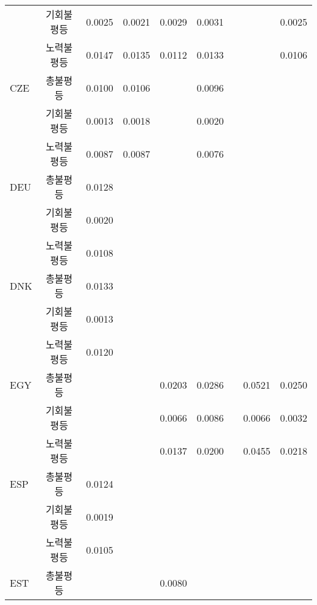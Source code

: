 \begin{longtable}{cc|rrrrrrr}
          & 기회불평등 & 0.0025 & 0.0021 & 0.0029 & 0.0031 &       &       & 0.0025 \\
          & 노력불평등 & 0.0147 & 0.0135 & 0.0112 & 0.0133 &       &       & 0.0106 \\
    \multicolumn{1}{l}{CZE} & 총불평등  & 0.0100 & 0.0106 &       & 0.0096 &       &       & \multicolumn{1}{l}{         } \\
          & 기회불평등 & 0.0013 & 0.0018 &       & 0.0020 &       &       & \multicolumn{1}{l}{         } \\
          & 노력불평등 & 0.0087 & 0.0087 &       & 0.0076 &       &       & \multicolumn{1}{l}{         } \\
    \multicolumn{1}{l}{DEU} & 총불평등  & 0.0128 &       &       &       &       &       & \multicolumn{1}{l}{         } \\
          & 기회불평등 & 0.0020 &       &       &       &       &       & \multicolumn{1}{l}{         } \\
          & 노력불평등 & 0.0108 &       &       &       &       &       & \multicolumn{1}{l}{         } \\
    \multicolumn{1}{l}{DNK} & 총불평등  & 0.0133 &       &       &       &       &       & \multicolumn{1}{l}{         } \\
          & 기회불평등 & 0.0013 &       &       &       &       &       & \multicolumn{1}{l}{         } \\
          & 노력불평등 & 0.0120 &       &       &       &       &       & \multicolumn{1}{l}{         } \\
    \multicolumn{1}{l}{EGY} & 총불평등  &       &       & 0.0203 & 0.0286 &       & 0.0521 & 0.0250 \\
          & 기회불평등 &       &       & 0.0066 & 0.0086 &       & 0.0066 & 0.0032 \\
          & 노력불평등 &       &       & 0.0137 & 0.0200 &       & 0.0455 & 0.0218 \\
    \multicolumn{1}{l}{ESP} & 총불평등  & 0.0124 &       &       &       &       &       & \multicolumn{1}{l}{         } \\
          & 기회불평등 & 0.0019 &       &       &       &       &       & \multicolumn{1}{l}{         } \\
          & 노력불평등 & 0.0105 &       &       &       &       &       & \multicolumn{1}{l}{         } \\
    \multicolumn{1}{l}{EST} & 총불평등  &       &       & 0.0080 &       &       &       & \multicolumn{1}{l}{         } \\

\end{longtable}
